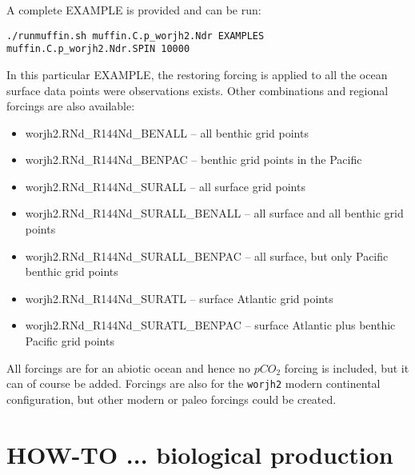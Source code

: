 \vspace{1mm}
A complete EXAMPLE is provided and can be run:

\vspace{-2mm}\begin{verbatim}./runmuffin.sh muffin.C.p_worjh2.Ndr EXAMPLES muffin.C.p_worjh2.Ndr.SPIN 10000\end{verbatim}\vspace{-2mm}

In this particular EXAMPLE, the restoring forcing is applied to all the ocean surface data points were observations exists. Other combinations and regional forcings are also available:

\vspace{1mm}
\begin{itemize}[noitemsep]
\item \textsf{\footnotesize worjh2.RNd\_R144Nd\_BENALL} -- all benthic grid points
\item \textsf{\footnotesize worjh2.RNd\_R144Nd\_BENPAC} -- benthic grid points in the Pacific
\item \textsf{\footnotesize worjh2.RNd\_R144Nd\_SURALL} -- all surface grid points
\item \textsf{\footnotesize worjh2.RNd\_R144Nd\_SURALL\_BENALL} -- all surface and all benthic grid points
\item \textsf{\footnotesize worjh2.RNd\_R144Nd\_SURALL\_BENPAC} -- all surface, but only Pacific benthic grid points
\item \textsf{\footnotesize worjh2.RNd\_R144Nd\_SURATL} -- surface Atlantic grid points
\item \textsf{\footnotesize worjh2.RNd\_R144Nd\_SURATL\_BENPAC} -- surface Atlantic plus benthic Pacific grid points
\end{itemize}
\vspace{1mm}

All forcings are for an abiotic ocean and hence no \(pCO_{2}\) forcing is included, but it can of course be added. Forcings are also for the \texttt{worjh2} modern continental configuration, but other modern or paleo forcings could be created.


\newpage


\section{HOW-TO ...  biological production}

